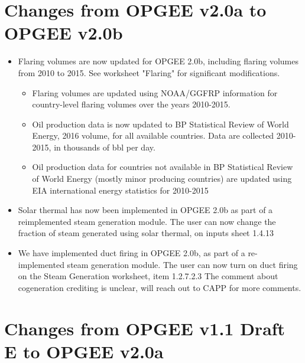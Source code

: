 \documentclass[11pt]{report}
\begin{document}
{{{{%
\section{Changes from OPGEE v2.0a to OPGEE v2.0b}

\begin{itemize}
\item Flaring volumes are now updated for OPGEE 2.0b, including flaring volumes from 2010 to 2015. See worksheet "Flaring" for significant modifications.
	\begin{itemize}
	\item Flaring volumes are updated using NOAA/GGFRP information for country-level flaring volumes over the years 2010-2015.
	\item Oil production data is now updated to BP Statistical Review of World Energy, 2016 volume, for all available countries. Data are collected 2010-2015, in thousands of bbl per day.
	\item Oil production data for countries not available in BP Statistical Review of World Energy (mostly minor producing countries) are updated using EIA international energy statistics for 2010-2015
	\end{itemize}
\item Solar thermal has now been implemented in OPGEE 2.0b as part of a reimplemented steam generation module. The user can now change the fraction of steam generated using solar thermal, on inputs sheet 1.4.13

\item We have implemented duct firing in OPGEE 2.0b, as part of a re-implemented steam generation module. The user can now turn on duct firing on the Steam Generation worksheet, item 1.2.7.2.3
The comment about cogeneration crediting is unclear, will reach out to CAPP for more comments.
\end{itemize}




\section{Changes from OPGEE v1.1 Draft E to OPGEE v2.0a}

\begin{itemize}


\end{itemize}}}}}
\end{document}
